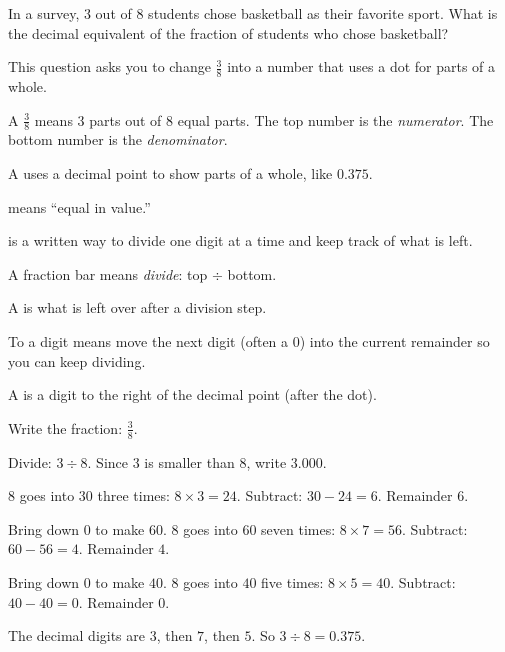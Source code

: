

\noindent In a survey, $3$ out of $8$ students chose basketball as their
favorite sport. What is the decimal equivalent of the fraction of students who
chose basketball?


\noindent This question asks you to change $\tfrac{3}{8}$ into a number that
uses a dot for parts of a whole.

\begin{words}
  \item A $\tfrac{3}{8}$ means $3$ parts out of $8$ equal parts. The top number is
        the \textit{numerator}. The bottom number is the \textit{denominator}.
  \item A uses a decimal point to show parts of a whole, like $0.375$.
  \item {}means ``equal in value.''
  \item {}is a written way to divide one digit at a time and keep track of what
        is left.
  \item A fraction bar means \textit{divide}: top $\div$ bottom.
  \item A is what is left over after a division step.
  \item To a digit means move the next digit (often a $0$) into the current
        remainder so you can keep dividing.
  \item A is a digit to the right of the decimal point (after the dot).
\end{words}

\begin{steps}
  \item Write the fraction: $\tfrac{3}{8}$.
  \item Divide: $3 \div 8$. Since $3$ is smaller than $8$, write $3.000$.
  \item $8$ goes into $30$ three times: $8 \times 3 = 24$. Subtract: $30 - 24 = 6$. Remainder $6$.
  \item Bring down $0$ to make $60$. $8$ goes into $60$ seven times: $8 \times 7 = 56$.
        Subtract: $60 - 56 = 4$. Remainder $4$.
  \item Bring down $0$ to make $40$. $8$ goes into $40$ five times: $8 \times 5 = 40$.
        Subtract: $40 - 40 = 0$. Remainder $0$.
  \item The decimal digits are $3$, then $7$, then $5$. So $3 \div 8 = 0.375$.
\end{steps}


